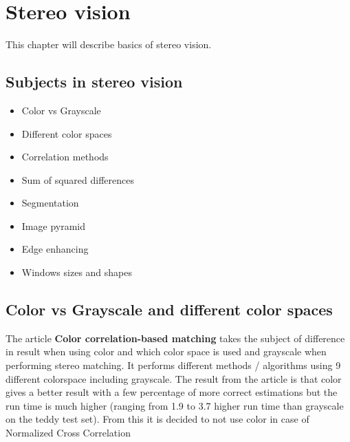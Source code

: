 \chapter{Stereo vision}
This chapter will describe basics of stereo vision.

\section{Subjects in stereo vision}

\begin{itemize}
\item Color vs Grayscale
\item Different color spaces
\item Correlation methods
\item Sum of squared differences
\item Segmentation
\item Image pyramid
\item Edge enhancing
\item Windows sizes and shapes
\end{itemize}

\section{Color vs Grayscale and different color spaces}
The article \textbf{Color correlation-based matching} takes the subject of difference in result when using color and which color space is used and grayscale when performing stereo matching. It performs different methods / algorithms using 9 different colorspace including grayscale. The result from the article is that color gives a better result with a few percentage of more correct estimations but the run time is much higher (ranging from 1.9 to 3.7 higher run time than grayscale on the teddy test set).
From this it is decided to not use color in case of Normalized Cross Correlation

